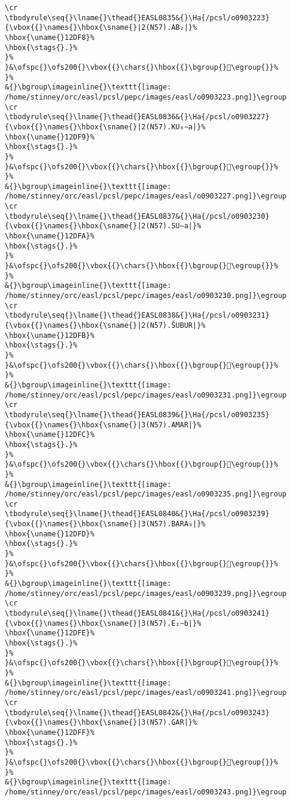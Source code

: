 \begin{verbatim}
\cr
\tbodyrule\seq{}\lname{}\thead{}EASL0835&{}\Ha{/pcsl/o0903223}{\vbox{{}\names{}\hbox{\sname{}|2(N57).AB₂|}%
\hbox{\uname{}12DF8}%
\hbox{\stags{}.}%
}%
}&\ofspc{}\ofs200{}\vbox{{}\chars{}\hbox{{}\bgroup{}𒷸\egroup{}}%
}%
&{}\bgroup\imageinline{}\texttt{[image: /home/stinney/orc/easl/pcsl/pepc/images/easl/o0903223.png]}\egroup
\cr
\tbodyrule\seq{}\lname{}\thead{}EASL0836&{}\Ha{/pcsl/o0903227}{\vbox{{}\names{}\hbox{\sname{}|2(N57).KU₆∼a|}%
\hbox{\uname{}12DF9}%
\hbox{\stags{}.}%
}%
}&\ofspc{}\ofs200{}\vbox{{}\chars{}\hbox{{}\bgroup{}𒷹\egroup{}}%
}%
&{}\bgroup\imageinline{}\texttt{[image: /home/stinney/orc/easl/pcsl/pepc/images/easl/o0903227.png]}\egroup
\cr
\tbodyrule\seq{}\lname{}\thead{}EASL0837&{}\Ha{/pcsl/o0903230}{\vbox{{}\names{}\hbox{\sname{}|2(N57).SU∼a|}%
\hbox{\uname{}12DFA}%
\hbox{\stags{}.}%
}%
}&\ofspc{}\ofs200{}\vbox{{}\chars{}\hbox{{}\bgroup{}𒷺\egroup{}}%
}%
&{}\bgroup\imageinline{}\texttt{[image: /home/stinney/orc/easl/pcsl/pepc/images/easl/o0903230.png]}\egroup
\cr
\tbodyrule\seq{}\lname{}\thead{}EASL0838&{}\Ha{/pcsl/o0903231}{\vbox{{}\names{}\hbox{\sname{}|2(N57).ŠUBUR|}%
\hbox{\uname{}12DFB}%
\hbox{\stags{}.}%
}%
}&\ofspc{}\ofs200{}\vbox{{}\chars{}\hbox{{}\bgroup{}𒷻\egroup{}}%
}%
&{}\bgroup\imageinline{}\texttt{[image: /home/stinney/orc/easl/pcsl/pepc/images/easl/o0903231.png]}\egroup
\cr
\tbodyrule\seq{}\lname{}\thead{}EASL0839&{}\Ha{/pcsl/o0903235}{\vbox{{}\names{}\hbox{\sname{}|3(N57).AMAR|}%
\hbox{\uname{}12DFC}%
\hbox{\stags{}.}%
}%
}&\ofspc{}\ofs200{}\vbox{{}\chars{}\hbox{{}\bgroup{}𒷼\egroup{}}%
}%
&{}\bgroup\imageinline{}\texttt{[image: /home/stinney/orc/easl/pcsl/pepc/images/easl/o0903235.png]}\egroup
\cr
\tbodyrule\seq{}\lname{}\thead{}EASL0840&{}\Ha{/pcsl/o0903239}{\vbox{{}\names{}\hbox{\sname{}|3(N57).BARA₃|}%
\hbox{\uname{}12DFD}%
\hbox{\stags{}.}%
}%
}&\ofspc{}\ofs200{}\vbox{{}\chars{}\hbox{{}\bgroup{}𒷽\egroup{}}%
}%
&{}\bgroup\imageinline{}\texttt{[image: /home/stinney/orc/easl/pcsl/pepc/images/easl/o0903239.png]}\egroup
\cr
\tbodyrule\seq{}\lname{}\thead{}EASL0841&{}\Ha{/pcsl/o0903241}{\vbox{{}\names{}\hbox{\sname{}|3(N57).E₂∼b|}%
\hbox{\uname{}12DFE}%
\hbox{\stags{}.}%
}%
}&\ofspc{}\ofs200{}\vbox{{}\chars{}\hbox{{}\bgroup{}𒷾\egroup{}}%
}%
&{}\bgroup\imageinline{}\texttt{[image: /home/stinney/orc/easl/pcsl/pepc/images/easl/o0903241.png]}\egroup
\cr
\tbodyrule\seq{}\lname{}\thead{}EASL0842&{}\Ha{/pcsl/o0903243}{\vbox{{}\names{}\hbox{\sname{}|3(N57).GAR|}%
\hbox{\uname{}12DFF}%
\hbox{\stags{}.}%
}%
}&\ofspc{}\ofs200{}\vbox{{}\chars{}\hbox{{}\bgroup{}𒷿\egroup{}}%
}%
&{}\bgroup\imageinline{}\texttt{[image: /home/stinney/orc/easl/pcsl/pepc/images/easl/o0903243.png]}\egroup

\end{verbatim}
